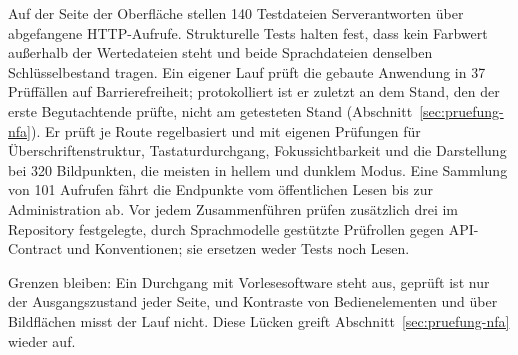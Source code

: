 Auf der Seite der Oberfläche stellen 140 Testdateien Serverantworten über abgefangene HTTP-Aufrufe. Strukturelle Tests halten fest, dass kein Farbwert außerhalb der Wertedateien steht und beide Sprachdateien denselben Schlüsselbestand tragen. Ein eigener Lauf prüft die gebaute Anwendung in 37 Prüffällen auf Barrierefreiheit; protokolliert ist er zuletzt an dem Stand, den der erste Begutachtende prüfte, nicht am getesteten Stand (Abschnitt~\ref{sec:pruefung-nfa}). Er prüft je Route regelbasiert und mit eigenen Prüfungen für Überschriftenstruktur, Tastaturdurchgang, Fokussichtbarkeit und die Darstellung bei 320 Bildpunkten, die meisten in hellem und dunklem Modus. Eine Sammlung von 101 Aufrufen fährt die Endpunkte vom öffentlichen Lesen bis zur Administration ab. Vor jedem Zusammenführen prüfen zusätzlich drei im Repository festgelegte, durch Sprachmodelle gestützte Prüfrollen gegen API-Contract und Konventionen; sie ersetzen weder Tests noch Lesen.

Grenzen bleiben: Ein Durchgang mit Vorlesesoftware steht aus, geprüft ist nur der Ausgangszustand jeder Seite, und Kontraste von Bedienelementen und über Bildflächen misst der Lauf nicht. Diese Lücken greift Abschnitt~\ref{sec:pruefung-nfa} wieder auf.
